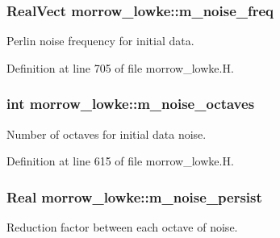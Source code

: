 \subsubsection[{\texorpdfstring{m\+\_\+noise\+\_\+freq}{m_noise_freq}}]{\setlength{\rightskip}{0pt plus 5cm}Real\+Vect morrow\+\_\+lowke\+::m\+\_\+noise\+\_\+freq}\hypertarget{classmorrow__lowke_a094345f4a8b83fa62ff0698c6da30f93}{}\label{classmorrow__lowke_a094345f4a8b83fa62ff0698c6da30f93}


Perlin noise frequency for initial data. 



Definition at line 705 of file morrow\+\_\+lowke.\+H.

\subsubsection[{\texorpdfstring{m\+\_\+noise\+\_\+octaves}{m_noise_octaves}}]{\setlength{\rightskip}{0pt plus 5cm}int morrow\+\_\+lowke\+::m\+\_\+noise\+\_\+octaves}\hypertarget{classmorrow__lowke_aaea4ac6fd1372821ce1641613091230b}{}\label{classmorrow__lowke_aaea4ac6fd1372821ce1641613091230b}


Number of octaves for initial data noise. 



Definition at line 615 of file morrow\+\_\+lowke.\+H.

\subsubsection[{\texorpdfstring{m\+\_\+noise\+\_\+persist}{m_noise_persist}}]{\setlength{\rightskip}{0pt plus 5cm}Real morrow\+\_\+lowke\+::m\+\_\+noise\+\_\+persist}\hypertarget{classmorrow__lowke_a76ea00933cfa6b6585f91a2b53e6c1c1}{}\label{classmorrow__lowke_a76ea00933cfa6b6585f91a2b53e6c1c1}


Reduction factor between each octave of noise. 



